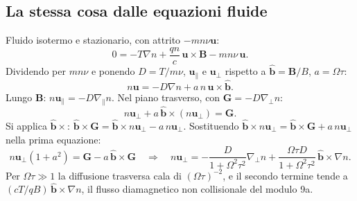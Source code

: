 \subsection{La stessa cosa dalle equazioni fluide}
Fluido isotermo e stazionario, con attrito $-mn\nu\mathbf{u}$:
\begin{equation}
0=-T\nabla n+\frac{qn}{c}\,\mathbf{u}\times\mathbf{B}-mn\nu\,\mathbf{u}.
\end{equation}
Dividendo per $mn\nu$ e ponendo $D=T/m\nu$, $\mathbf{u}_\parallel$ e $\mathbf{u}_\perp$ rispetto a $\hat{\mathbf{b}}=\mathbf{B}/B$, $a=\Omega\tau$:
\begin{equation}
n\mathbf{u}=-D\nabla n+a\,n\,\mathbf{u}\times\hat{\mathbf{b}}.
\end{equation}
Lungo $\mathbf{B}$: $n\mathbf{u}_\parallel=-D\nabla_\parallel n$. Nel piano trasverso, con $\mathbf{G}=-D\nabla_\perp n$:
\begin{equation}
n\mathbf{u}_\perp+a\,\hat{\mathbf{b}}\times(n\mathbf{u}_\perp)=\mathbf{G}.
\end{equation}
Si applica $\hat{\mathbf{b}}\times$: $\hat{\mathbf{b}}\times\mathbf{G}=\hat{\mathbf{b}}\times n\mathbf{u}_\perp-a\,n\mathbf{u}_\perp$. Sostituendo $\hat{\mathbf{b}}\times n\mathbf{u}_\perp=\hat{\mathbf{b}}\times\mathbf{G}+a\,n\mathbf{u}_\perp$ nella prima equazione:
\begin{equation}
n\mathbf{u}_\perp(1+a^2)=\mathbf{G}-a\,\hat{\mathbf{b}}\times\mathbf{G}\quad\Rightarrow\quad n\mathbf{u}_\perp=-\frac{D}{1+\Omega^2\tau^2}\nabla_\perp n+\frac{\Omega\tau D}{1+\Omega^2\tau^2}\,\hat{\mathbf{b}}\times\nabla n .
\end{equation}
Per $\Omega\tau\gg1$ la diffusione trasversa cala di $(\Omega\tau)^{-2}$, e il secondo termine tende a $(cT/qB)\,\hat{\mathbf{b}}\times\nabla n$, il flusso diamagnetico non collisionale del modulo 9a.

